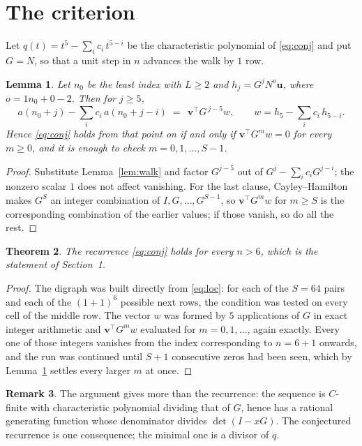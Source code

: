 \documentclass[11pt,a4paper]{article}
\theoremstyle{plain}
\newtheorem{theorem}{Theorem}
\newtheorem{lemma}[theorem]{Lemma}
\theoremstyle{definition}
\newtheorem{remark}[theorem]{Remark}
\begin{document}
\section{The criterion}

Let $q(t)=t^{5}-\sum_i c_i\,t^{5-i}$ be the characteristic polynomial of
\eqref{eq:conj} and put $G=N$, so that a unit step in $n$ advances the walk by
$1$ row.

\begin{lemma}\label{lem:crit}
Let $n_0$ be the least index with $L\ge2$ and $h_j=G^{j}N^{o}\mathbf{u}$, where
$o=1n_0+0-2$. Then for $j\ge5$,
\[
a(n_0+j)-\sum_i c_i\,a(n_0+j-i)\;=\;\,\mathbf{v}^{\!\top}G^{\,j-5}w,
\qquad w=h_{5}-\sum_i c_i\,h_{5-i} .
\]
Hence \eqref{eq:conj} holds from that point on if and only if
$\mathbf{v}^{\!\top}G^{m}w=0$ for every $m\ge0$, and it is enough to check
$m=0,1,\dots,S-1$.
\end{lemma}

\begin{proof}
Substitute Lemma~\ref{lem:walk} and factor $G^{j-5}$ out of
$G^{j}-\sum_ic_iG^{j-i}$; the nonzero scalar $1$ does not affect
vanishing. For the last clause, Cayley--Hamilton makes $G^{S}$ an integer combination of
$I,G,\dots,G^{S-1}$, so $\mathbf{v}^{\!\top}G^{m}w$ for $m\ge S$ is the corresponding
combination of the earlier values; if those vanish, so do all the rest.
\end{proof}

\begin{theorem}
The recurrence \eqref{eq:conj} holds for every $n>6$, which is the statement of
Section~1.
\end{theorem}

\begin{proof}
The digraph was built directly from \eqref{eq:loc}: for each of the $S=64$ pairs and each
of the $(1+1)^{6}$ possible next rows, the condition was tested on every cell of
the middle row. The vector $w$ was formed by $5$ applications of $G$ in exact integer
arithmetic and $\mathbf{v}^{\!\top}G^{m}w$ evaluated for $m=0,1,\dots$, again exactly.
Every one of those integers vanishes from the index corresponding to $n=6+1$ onwards,
and the run was continued until $S+1$ consecutive zeros had been seen, which by
Lemma~\ref{lem:crit} settles every larger $m$ at once.
\end{proof}

\begin{remark}
The argument gives more than the recurrence: the sequence is $C$-finite with characteristic
polynomial dividing that of $G$, hence has a rational generating function whose denominator
divides $\det(I-xG)$. The conjectured recurrence is one consequence; the minimal one is a
divisor of $q$.
\end{remark}
\end{document}
